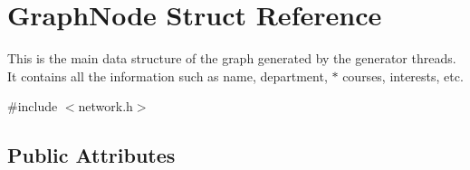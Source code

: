 \hypertarget{structGraphNode}{\section{\-Graph\-Node \-Struct \-Reference}
\label{structGraphNode}
}


\-This is the main data structure of the graph generated by the generator threads. \-It contains all the information such as name, department, $\ast$ courses, interests, etc.  




{\ttfamily \#include $<$network.\-h$>$}

\subsection*{\-Public \-Attributes}
